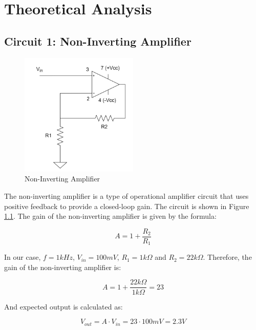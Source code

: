 \chapter{Theoretical Analysis}

\section{Circuit 1: Non-Inverting Amplifier}

\begin{figure}[h]
    \centering
    \includegraphics[width=0.5\textwidth]{assets/non-inverting.png}
    \caption{Non-Inverting Amplifier}
    \label{fig:non-inverting-amplifier}
\end{figure}

The non-inverting amplifier is a type of operational amplifier circuit that uses positive feedback to provide a closed-loop gain. The circuit is shown in Figure \ref{fig:non-inverting-amplifier}. The gain of the non-inverting amplifier is given by the formula:

\begin{equation}
    A = 1 + \frac{R_2}{R_1}
\end{equation}

In our case, $f = 1kHz$, $V_{in} = 100mV$, $R_1 = 1k\Omega$ and $R_2 = 22k\Omega$. Therefore, the gain of the non-inverting amplifier is:

\begin{equation}
    A = 1 + \frac{22k\Omega}{1k\Omega} = 23
\end{equation}

\noindent And expected output is calculated as:

\begin{equation}
    V_{out} = A \cdot V_{in} = 23 \cdot 100mV = 2.3V
\end{equation}

